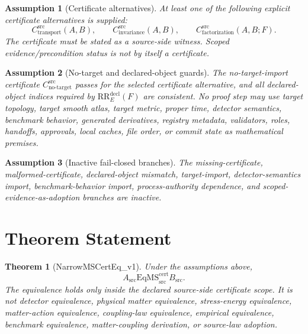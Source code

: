 \documentclass[11pt]{article}
\newcommand{\RREObj}{\mathrm{RR}_{E}^{\mathrm{decl}}}
\newcommand{\CTr}{C_{\mathrm{transport}}^{\mathrm{src}}}
\newcommand{\CInv}{C_{\mathrm{invariance}}^{\mathrm{src}}}
\newcommand{\CFact}{C_{\mathrm{factorization}}^{\mathrm{src}}}
\newcommand{\CNTI}{C_{\mathrm{no\text{-}target}}^{\mathrm{src}}}
\newcommand{\EqMS}{\mathrm{EqMS}_{\mathrm{src}}^{\mathrm{cert}}}
\newtheorem{assumption}{Assumption}
\newtheorem{theorem}{Theorem}
\begin{document}
\begin{assumption}[Certificate alternatives]
At least one of the following explicit certificate alternatives is supplied:
\[
\CTr(A,B),\qquad \CInv(A,B),\qquad \CFact(A,B;F).
\]
The certificate must be stated as a source-side witness. Scoped
evidence/precondition status is not by itself a certificate.
\end{assumption}

\begin{assumption}[No-target and declared-object guards]
The no-target-import certificate \(\CNTI\) passes for the selected certificate
alternative, and all declared-object indices required by \(\RREObj(F)\) are
consistent. No proof step may use target topology, target smooth atlas, target
metric, proper time, detector semantics, benchmark behavior, generated
derivatives, registry metadata, validators, roles, handoffs, approvals, local
caches, file order, or commit state as mathematical premises.
\end{assumption}

\begin{assumption}[Inactive fail-closed branches]
The missing-certificate, malformed-certificate, declared-object mismatch,
target-import, detector-semantics import, benchmark-behavior import,
process-authority dependence, and scoped-evidence-as-adoption branches are
inactive.
\end{assumption}

\section{Theorem Statement}

\begin{theorem}[NarrowMSCertEq\_v1]
Under the assumptions above,
\[
  A_{\mathrm{src}} \EqMS B_{\mathrm{src}}.
\]
The equivalence holds only inside the declared source-side certificate scope.
It is not detector equivalence, physical matter equivalence, stress-energy
equivalence, matter-action equivalence, coupling-law equivalence, empirical
equivalence, benchmark equivalence, matter-coupling derivation, or source-law
adoption.
\end{theorem}
\end{document}
